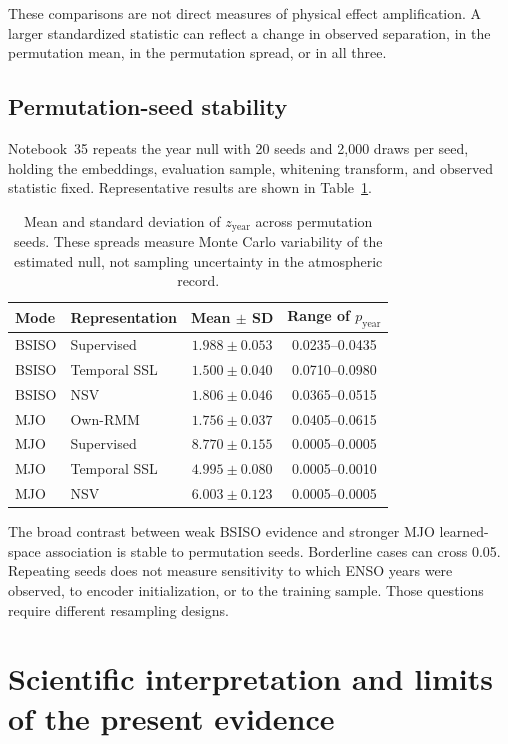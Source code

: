 \documentclass[11pt]{article}
\begin{document}
These comparisons are not direct measures of physical effect amplification. A larger standardized statistic can reflect a change in observed separation, in the permutation mean, in the permutation spread, or in all three.

\subsection{Permutation-seed stability}

Notebook~35 repeats the year null with 20 seeds and 2,000 draws per seed, holding the embeddings, evaluation sample, whitening transform, and observed statistic fixed. Representative results are shown in Table~\ref{tab:seeds}.

\begin{table}[htbp]
\centering\small
\caption{Mean and standard deviation of $z_{\mathrm{year}}$ across permutation seeds. These spreads measure Monte Carlo variability of the estimated null, not sampling uncertainty in the atmospheric record.}
\label{tab:seeds}
\begin{tabular}{llcc}
\toprule
Mode & Representation & Mean $\pm$ SD & Range of $p_{\mathrm{year}}$\\
\midrule
BSISO & Supervised & $1.988\pm0.053$ & 0.0235--0.0435\\
BSISO & Temporal SSL & $1.500\pm0.040$ & 0.0710--0.0980\\
BSISO & NSV & $1.806\pm0.046$ & 0.0365--0.0515\\
MJO & Own-RMM & $1.756\pm0.037$ & 0.0405--0.0615\\
MJO & Supervised & $8.770\pm0.155$ & 0.0005--0.0005\\
MJO & Temporal SSL & $4.995\pm0.080$ & 0.0005--0.0010\\
MJO & NSV & $6.003\pm0.123$ & 0.0005--0.0005\\
\bottomrule
\end{tabular}
\end{table}

The broad contrast between weak BSISO evidence and stronger MJO learned-space association is stable to permutation seeds. Borderline cases can cross 0.05. Repeating seeds does not measure sensitivity to which ENSO years were observed, to encoder initialization, or to the training sample. Those questions require different resampling designs.

\section{Scientific interpretation and limits of the present evidence}
\label{sec:interpretation}
\end{document}
